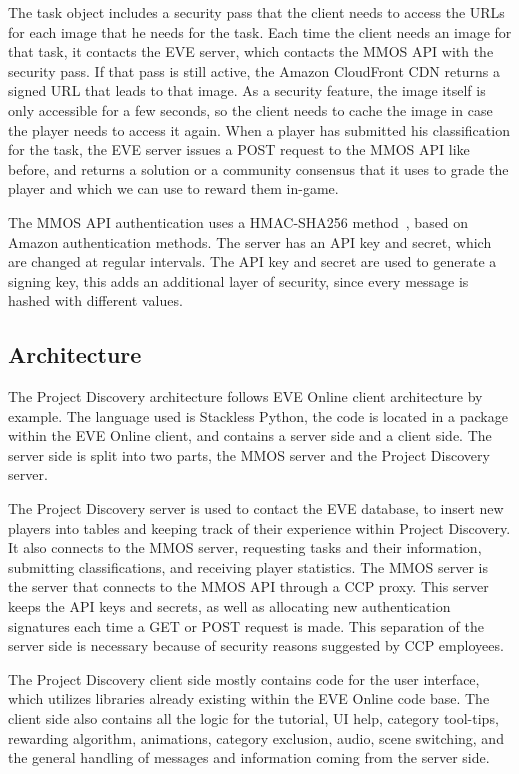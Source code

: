 The task object includes a security pass that the client needs to access the URLs for each image that he needs for the task. Each time the client needs an image for that task, it contacts the EVE server, which contacts the MMOS API with the security pass. If that pass is still active, the Amazon CloudFront CDN returns a signed URL that leads to that image. As a security feature, the image itself is only accessible for a few seconds, so the client needs to cache the image in case the player needs to access it again. When a player has submitted his classification for the task, the EVE server issues a POST request to the MMOS API like before, and returns a solution or a community consensus that it uses to grade the player and which we can use to reward them in-game.

The MMOS API authentication uses a HMAC-SHA256 method~\cite{hmac}, based on Amazon authentication methods. The server has an API key and secret, which are changed at regular intervals. The API key and secret are used to generate a signing key, this adds an additional layer of security, since every message is hashed with different values.

\subsection{Architecture}
The Project Discovery architecture follows EVE Online client architecture by example. The language used is Stackless Python, the code is located in a package within the EVE Online client, and contains a server side and a client side. The server side is split into two parts, the MMOS server and the Project Discovery server. 

The Project Discovery server is used to contact the EVE database, to insert new players into tables and keeping track of their experience within Project Discovery. It also connects to the MMOS server, requesting tasks and their information, submitting classifications, and receiving player statistics. The MMOS server is the server that connects to the MMOS API through a CCP proxy. This server keeps the API keys and secrets, as well as allocating new authentication signatures each time a GET or POST request is made. This separation of the server side is necessary because of security reasons suggested by CCP employees.

The Project Discovery client side mostly contains code for the user interface, which utilizes libraries already existing within the EVE Online code base. The client side also contains all the logic for the tutorial, UI help, category tool-tips, rewarding algorithm, animations, category exclusion, audio, scene switching, and the general handling of messages and information coming from the server side.


